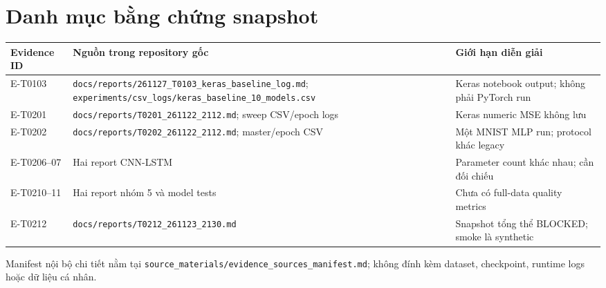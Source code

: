 \documentclass[12pt,a4paper,oneside]{book}
\begin{document}
\frontmatter

\tableofcontents
\listoffigures
\listoftables
\mainmatter





\printbibliography[heading=bibintoc,title={Tài liệu tham khảo}]
\appendix
\chapter{Danh mục bằng chứng snapshot}
\begin{longtable}{p{}p{}p{}}
\toprule Evidence ID & Nguồn trong repository gốc & Giới hạn diễn giải \\
\midrule
E-T0103 & \texttt{docs/reports/261127\_T0103\_keras\_baseline\_log.md}; \texttt{experiments/csv\_logs/keras\_baseline\_10\_models.csv} & Keras notebook output; không phải PyTorch run \\
E-T0201 & \texttt{docs/reports/T0201\_261122\_2112.md}; sweep CSV/epoch logs & Keras numeric MSE không lưu \\
E-T0202 & \texttt{docs/reports/T0202\_261122\_2112.md}; master/epoch CSV & Một MNIST MLP run; protocol khác legacy \\
E-T0206--07 & Hai report CNN-LSTM & Parameter count khác nhau; cần đối chiếu \\
E-T0210--11 & Hai report nhóm 5 và model tests & Chưa có full-data quality metrics \\
E-T0212 & \texttt{docs/reports/T0212\_261123\_2130.md} & Snapshot tổng thể BLOCKED; smoke là synthetic \\
\bottomrule
\end{longtable}
Manifest nội bộ chi tiết nằm tại \texttt{source\_materials/evidence\_sources\_manifest.md}; không đính kèm dataset, checkpoint, runtime logs hoặc dữ liệu cá nhân.
\end{document}
